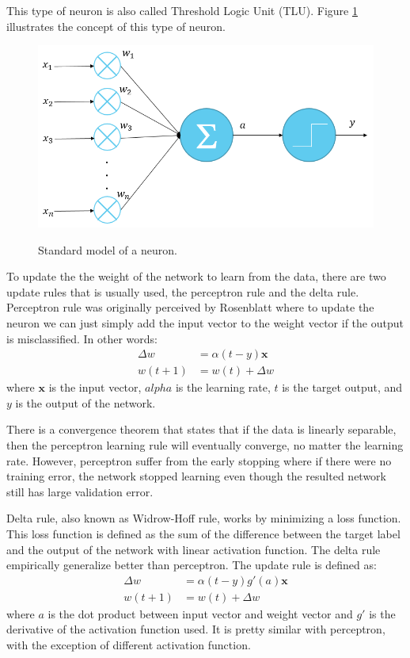 \documentclass[a4paper,11pt]{kth-mag}
\begin{document}
This type of neuron is also called Threshold Logic Unit (TLU). Figure \ref{fig:neuron} illustrates the concept of this type of neuron.

\begin{figure}[h]
\centering
\includegraphics[scale=0.3]{image/neuron.png}
\label{fig:neuron}
\caption{Standard model of a neuron.}
\end{figure}

To update the the weight of the network to learn from the data, there are two update rules that is usually used, the perceptron rule and the delta rule. Perceptron rule was originally perceived by Rosenblatt \cite{rosenblatt1957perceptron} where to update the neuron we can just simply add the input vector to the weight vector if the output is misclassified. In other words: 
\begin{equation}
\begin{split}
\Delta w & = \alpha (t-y) \bm{x} \\
w(t+1) & = w(t) + \Delta w
\end{split}
\end{equation}
where $\bm{x}$ is the input vector, $alpha$ is the learning rate, $t$ is the target output, and $y$ is the output of the network.

There is a convergence theorem that states that if the data is linearly separable, then the perceptron learning rule will eventually converge, no matter the learning rate. However, perceptron suffer from the early stopping where if there were no training error, the network stopped learning even though the resulted network still has large validation error.

Delta rule, also known as Widrow-Hoff rule, works by minimizing a loss function. This loss function is defined as the sum of the difference between the target label and the output of the network with linear activation function. The delta rule empirically generalize better than perceptron. The update rule is defined as:
\begin{equation}
\begin{split}
\Delta w & = \alpha (t-y) g'(a) \bm{x} \\
w(t+1) & = w(t) + \Delta w
\end{split}
\end{equation}
where $a$ is the dot product between input vector and weight vector and $g'$ is the derivative of the activation function used. It is pretty similar with perceptron, with the exception of different activation function.
\end{document}
